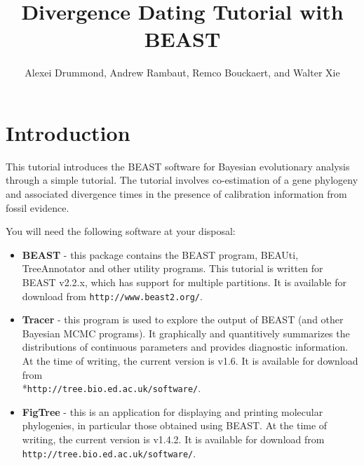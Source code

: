 \documentclass[11pt]{article}
\title{Divergence Dating Tutorial with BEAST {\BEASTVersion}}
\author{Alexei Drummond, Andrew Rambaut, Remco Bouckaert, and Walter Xie}
\newcommand{\BEASTVersion}{2.2.x}
\newcommand{\TracerVersion}{1.6}
\newcommand{\FigTreeVersion}{1.4.2}
\theoremstyle{plain}%
\theoremstyle{definition}
\theoremstyle{remark}
\begin{document}
\maketitle

\newcommand{\chainLength}{{6,000,000}}
\newcommand{\logEvery}{{1,000}}
\newcommand{\tracesNumber}{{6,000}} %
\newcommand{\screenEvery}{{10,000}}
\newcommand{\mccTree}{{\texttt{Primates.MCC.tree}}}

\section{Introduction}

This tutorial introduces the BEAST software for Bayesian evolutionary analysis through a simple tutorial. The tutorial involves co-estimation of a gene phylogeny and associated divergence times in the presence of calibration information from fossil evidence. 

You will need the following software at your disposal:

\begin{itemize}

\item {\bf BEAST} - this package contains the BEAST program, BEAUti, TreeAnnotator and other utility programs. This tutorial is written for BEAST v{\BEASTVersion}, which has support for multiple partitions. It is available for download from \texttt{http://www.beast2.org/}.
\item {\bf Tracer} - this program is used to explore the output of BEAST (and other Bayesian MCMC programs). It graphically and
quantitively summarizes the distributions of continuous parameters and provides diagnostic information. At the time of
writing, the current version is v{\TracerVersion}. It is available for download from\\*\texttt{http://tree.bio.ed.ac.uk/software/}.
\item {\bf FigTree} - this is an application for displaying and printing molecular phylogenies, in particular those obtained using
BEAST. At the time of writing, the current version is v{\FigTreeVersion}. It is available for download from \texttt{http://tree.bio.ed.ac.uk/software/}.
\end{itemize}


\end{document}
